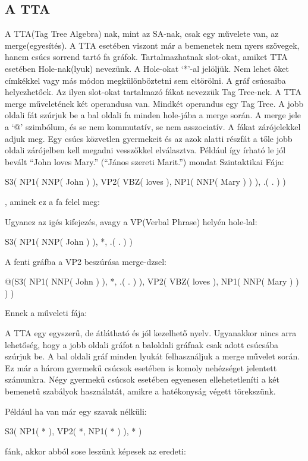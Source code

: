 \subsection{A TTA}
A TTA(Tag Tree Algebra) nak, mint az SA-nak, csak egy művelete van, az merge(egyesítés). A TTA esetében viszont  már a bemenetek nem nyers szövegek, hanem csúcs sorrend tartó fa gráfok. Tartalmazhatnak slot-okat, amiket TTA esetében Hole-nak(lyuk) nevezünk. A Hole-okat ‘*’-al jelöljük. Nem lehet őket címkékkel vagy más módon megkülönböztetni sem eltörölni. A gráf csúcsaiba helyezhetőek. Az ilyen slot-okat tartalmazó fákat nevezzük Tag Tree-nek. A TTA merge műveletének két operandusa van. Mindkét operandus egy Tag Tree. A jobb oldali fát szúrjuk be a bal oldali fa minden hole-jába a merge során. A merge jele a ‘@’ szimbólum, és se nem kommutatív, se nem asszociatív. A fákat zárójelekkel adjuk meg. Egy csúcs közvetlen gyermekeit és az azok alatti részfát a tőle jobb oldali zárójelben kell megadni vesszőkkel elválasztva. Például így írható le jól bevált “John loves Mary.” (“János szereti Marit.”) mondat Szintaktikai Fája:

S3( NP1( NNP( John ) ), VP2( VBZ( loves ),  NP1( NNP( Mary ) ) ), .( . ) )

, aminek ez a fa felel meg:

Ugyanez az igés kifejezés, avagy a VP(Verbal Phrase) helyén hole-lal:

S3( NP1( NNP( John ) ), *, .( . ) )

A fenti gráfba a VP2 beszúrása merge-dzsel:

@(S3( NP1( NNP( John ) ), *, .( . ) ),  VP2( VBZ( loves ), NP1( NNP( Mary ) ) ) )

Ennek a műveleti fája:

A TTA egy egyszerű, de átlátható és jól kezelhető nyelv. Ugyanakkor nincs arra lehetőség, hogy a jobb oldali gráfot a baloldali gráfnak csak adott csúcsába szúrjuk be. A bal oldali gráf minden lyukát felhasználjuk a merge művelet során. Ez már a három gyermekű csúcsok esetében is komoly nehézséget jelentett számunkra. Négy gyermekű csúcsok esetében egyenesen ellehetetleníti a két bemenetű szabályok használatát, amikre a hatékonyság végett törekszünk.

Például ha van már egy szavak nélküli:

S3( NP1( * ), VP2( *,  NP1( * ) ), * )

fánk, akkor abból sose leszünk képesek az eredeti:

